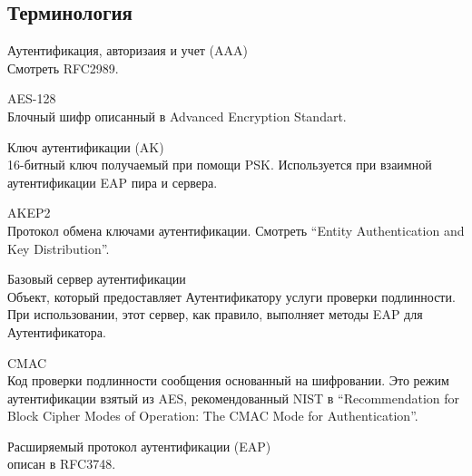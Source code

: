 \subsection{Терминология}

Аутентификация, авторизаия и учет (AAA) \\ Смотреть RFC2989.

AES-128 \\ Блочный шифр описанный в Advanced Encryption Standart.

Ключ аутентификации (AK) \\ 16-битный ключ получаемый при помощи PSK. Используется при взаимной аутентификации EAP пира и сервера.

AKEP2 \\ Протокол обмена ключами аутентификации. Смотреть ``Entity Authentication and Key Distribution''.

Базовый сервер аутентификации \\ Объект, который предоставляет Аутентификатору услуги проверки подлинности. При использовании, этот сервер, как правило, выполняет методы EAP для Аутентификатора.

CMAC \\ Код проверки подлинности сообщения основанный на шифровании. Это режим аутентификации взятый из AES, рекомендованный NIST в ``Recommendation for Block Cipher Modes of Operation: The CMAC Mode for Authentication''.

Расширяемый протокол аутентификации (EAP) \\ описан в RFC3748.


